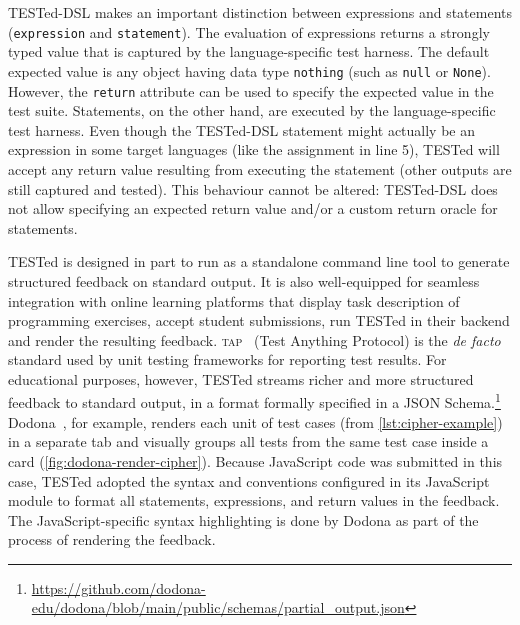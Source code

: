 \documentclass[../main]{subfiles}
\begin{document}
TESTed-DSL makes an important distinction between expressions and statements (\texttt{expression} and \texttt{statement}).
The evaluation of expressions returns a strongly typed value that is captured by the language-specific test harness.
The default expected value is any object having data type \texttt{nothing} (such as \texttt{null} or \texttt{None}).
However, the \texttt{return} attribute can be used to specify the expected value in the test suite.
Statements, on the other hand, are executed by the language-specific test harness.
Even though the TESTed-DSL statement might actually be an expression in some target languages (like the assignment in line 5),
TESTed will accept any return value resulting from executing the statement (other outputs are still captured and tested).
This behaviour cannot be altered: TESTed-DSL does not allow specifying an expected return value and/or a custom return oracle for statements.

TESTed is designed in part to run as a standalone command line tool to generate structured feedback on standard output.
It is also well-equipped for seamless integration with online learning platforms that display task description of programming exercises, accept student submissions, run TESTed in their backend and render the resulting feedback.
\textsc{tap}~\autocite{schlueterTAP14TestAnything2022} (Test Anything Protocol) is the \textit{de facto} standard used by unit testing frameworks for reporting test results.
For educational purposes, however, TESTed streams richer and more structured feedback to standard output, in a format formally specified in a JSON Schema.\footnote{\url{ https://github.com/dodona-edu/dodona/blob/main/public/schemas/partial_output.json}}
Dodona~\autocite{vanpetegemDodonaLearnCode2023}, for example, renders each unit of test cases (from \cref{lst:cipher-example}) in a separate tab and visually groups all tests from the same test case inside a card (\cref{fig:dodona-render-cipher}).
Because JavaScript code was submitted in this case, TESTed adopted the syntax and conventions configured in its JavaScript module to format all statements, expressions, and return values in the feedback.
The JavaScript-specific syntax highlighting is done by Dodona as part of the process of rendering the feedback.
\end{document}
